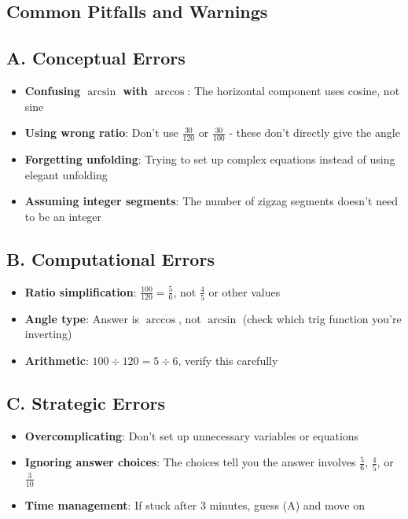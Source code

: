 \documentclass[11pt]{article}
\begin{document}
\begin{pitfallbox}
\section*{Common Pitfalls and Warnings}

\subsection*{A. Conceptual Errors}
\begin{itemize}[leftmargin=*]
    \item \textbf{Confusing $\arcsin$ with $\arccos$}: The horizontal component uses cosine, not sine
    \item \textbf{Using wrong ratio}: Don't use $\frac{30}{120}$ or $\frac{30}{100}$ - these don't directly give the angle
    \item \textbf{Forgetting unfolding}: Trying to set up complex equations instead of using elegant unfolding
    \item \textbf{Assuming integer segments}: The number of zigzag segments doesn't need to be an integer
\end{itemize}

\subsection*{B. Computational Errors}
\begin{itemize}[leftmargin=*]
    \item \textbf{Ratio simplification}: $\frac{100}{120} = \frac{5}{6}$, not $\frac{4}{5}$ or other values
    \item \textbf{Angle type}: Answer is $\arccos$, not $\arcsin$ (check which trig function you're inverting)
    \item \textbf{Arithmetic}: $100 \div 120 = 5 \div 6$, verify this carefully
\end{itemize}

\subsection*{C. Strategic Errors}
\begin{itemize}[leftmargin=*]
    \item \textbf{Overcomplicating}: Don't set up unnecessary variables or equations
    \item \textbf{Ignoring answer choices}: The choices tell you the answer involves $\frac{5}{6}$, $\frac{4}{5}$, or $\frac{3}{10}$
    \item \textbf{Time management}: If stuck after 3 minutes, guess (A) and move on
\end{itemize}


\end{pitfallbox}
\end{document}
